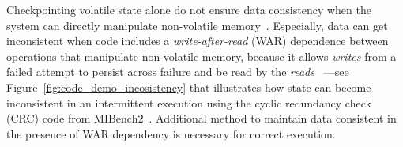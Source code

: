 Checkpointing volatile state alone do not ensure data consistency when the
system can directly manipulate non-volatile memory~\cite{mspcdino}.
Especially, data can get inconsistent when code includes a
\emph{write-after-read} (WAR) dependence between operations that manipulate
non-volatile memory, because it allows {\em writes} from a failed attempt to
persist across failure and be read by the {\em
reads}~\cite{ratchet,dino,alpaca} ---see
Figure~\ref{fig:code_demo_incosistency} that illustrates how state can become
inconsistent in an intermittent execution using the cyclic redundancy check
(CRC) code from MIBench2~\cite{hicks_mibench2_2016}.  Additional method to
maintain data consistent in the presence of WAR dependency is necessary for
correct execution.


